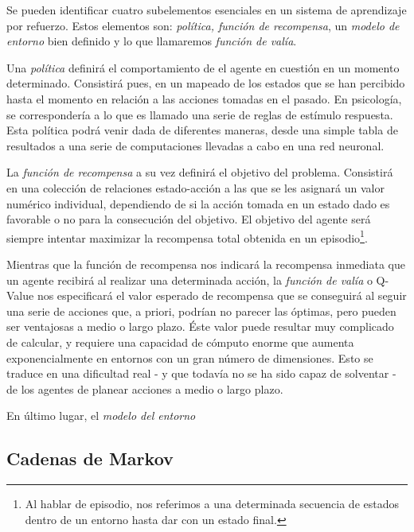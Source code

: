 \documentclass[11pt,spanish,listoffigures,listoftables]{tfgetsinf}
\begin{document}
Se pueden identificar cuatro subelementos esenciales en un sistema de aprendizaje por refuerzo. Estos elementos son: \textit{política, función de recompensa}, un \textit{modelo de entorno} bien definido y lo que llamaremos \textit{función de valía}.

Una \textit{política} definirá el comportamiento de el agente en cuestión en un momento determinado. Consistirá pues, en un mapeado de los estados que se han percibido hasta el momento en relación a las acciones tomadas en el pasado. En psicología, se correspondería a lo que es llamado una serie de reglas de estímulo respuesta. Esta política podrá venir dada de diferentes maneras, desde una simple tabla de resultados a una serie de computaciones llevadas a cabo en una red neuronal.

La \textit{función de recompensa} a su vez definirá el objetivo del problema. Consistirá en una colección de relaciones estado-acción a las que se les asignará un valor numérico individual, dependiendo de si la acción tomada en un estado dado es favorable o no para la consecución del objetivo. El objetivo del agente será siempre intentar maximizar la recompensa total obtenida en un episodio\footnote{Al hablar de episodio, nos referimos a una determinada secuencia de estados dentro de un entorno hasta dar con un estado final.}.

Mientras que la función de recompensa nos indicará la recompensa inmediata que un agente recibirá al realizar una determinada acción, la \textit{función de valía} o Q-Value nos especificará el valor esperado de recompensa que se conseguirá al seguir una serie de acciones que, a priori, podrían no parecer las óptimas, pero pueden ser ventajosas a medio o largo plazo. Éste valor puede resultar muy complicado de calcular, y requiere una capacidad de cómputo enorme que aumenta exponencialmente en entornos con un gran número de dimensiones. Esto se traduce en una dificultad real - y que todavía no se ha sido capaz de solventar - de los agentes de planear acciones a medio o largo plazo. 

En último lugar, el \textit{modelo del entorno}



\subsection{Cadenas de Markov}
\end{document}
